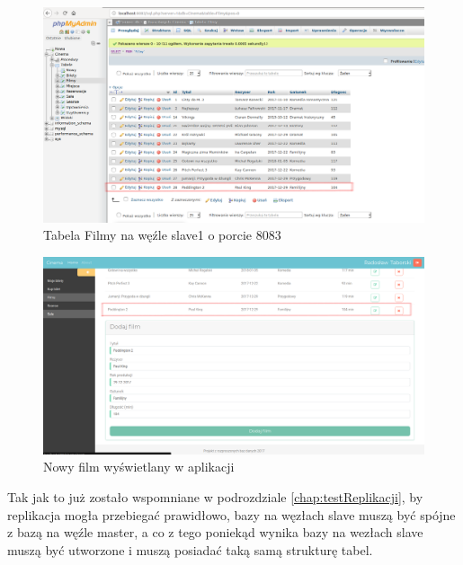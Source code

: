 \begin{figure} [H]
	\centering
	\includegraphics[width=1\linewidth]{rozdzial06/8.png}
	\caption{Tabela Filmy na węźle slave1 o porcie 8083}
	\label{fig:FilmSlave}
\end{figure}

\begin{figure} [H]
	\centering
	\includegraphics[width=1\linewidth]{rozdzial06/6.png}
	\caption{Nowy film wyświetlany w aplikacji}
	\label{fig:endAddFilm}
\end{figure}

Tak jak to już zostało wspomniane w podrozdziale \ref{chap:testReplikacji}, by replikacja mogła przebiegać prawidłowo, bazy na węzłach slave muszą być spójne z bazą na węźle master, a co z tego poniekąd wynika bazy na wezłach slave muszą być utworzone i muszą posiadać taką samą strukturę tabel.

